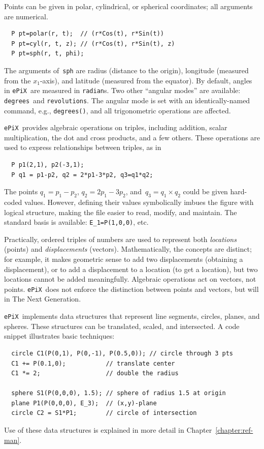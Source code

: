 \documentclass[12pt]{report}
\newcommand{\code}[1]{\texttt{#1}}
\newcommand{\ePiX}{\code{ePiX}}
\begin{document}
Points can be given in polar, cylindrical, or spherical coordinates;
all arguments are numerical.
\begin{verbatim}
  P pt=polar(r, t);  // (r*Cos(t), r*Sin(t))
  P pt=cyl(r, t, z); // (r*Cos(t), r*Sin(t), z)
  P pt=sph(r, t, phi);
\end{verbatim}
The arguments of~\code{sph} are radius (distance to the origin),
longitude (measured from the $x_1$-axis), and latitude (measured from
the equator).  By default, angles in \ePiX\ are
measured in \code{radian}s. Two other ``angular modes'' are available:
\code{degrees}~and \code{revolutions}. The angular mode is set with an
identically-named command, e.g., \code{degrees()}, and all
trigonometric operations are affected.

\ePiX\ provides algebraic operations on triples, including addition,
scalar multiplication, the dot and cross products, and a few others.
These operations are used to express relationships between triples, as
in
\begin{verbatim}
  P p1(2,1), p2(-3,1);
  P q1 = p1-p2, q2 = 2*p1-3*p2, q3=q1*q2;
\end{verbatim}
The points $q_1=p_1-p_2$, $q_2=2p_1-3p_2$, and~$q_3=q_1\times q_2$
could be given hard-coded values.  However, defining their values
symbolically imbues the figure with logical structure, making the file
easier to read, modify, and maintain. The standard basis is available:
\code{E\_1=P(1,0,0)}, etc.

Practically, ordered triples of numbers are used to represent both
\emph{locations} (points) and \emph{displacements} (vectors).
Mathematically, the concepts are distinct; for example, it makes
geometric sense to add two displacements (obtaining a displacement),
or to add a displacement to a location (to get a location), but two
locations cannot be added meaningfully. Algebraic operations act on
vectors, not points. \ePiX\ does not enforce the distinction between
points and vectors, but will in The Next Generation.


\ePiX\ implements data structures that represent line segments,
circles, planes, and spheres. These structures can be translated,
scaled, and intersected. A code snippet illustrates basic techniques:
\begin{verbatim}
  circle C1(P(0,1), P(0,-1), P(0.5,0)); // circle through 3 pts
  C1 += P(0.1,0);           // translate center
  C1 *= 2;                  // double the radius

  sphere S1(P(0,0,0), 1.5); // sphere of radius 1.5 at origin
  plane P1(P(0,0,0), E_3);  // (x,y)-plane
  circle C2 = S1*P1;        // circle of intersection
\end{verbatim}
Use of these data structures is explained in more detail in
Chapter~\ref{chapter:ref-man}.
\end{document}
